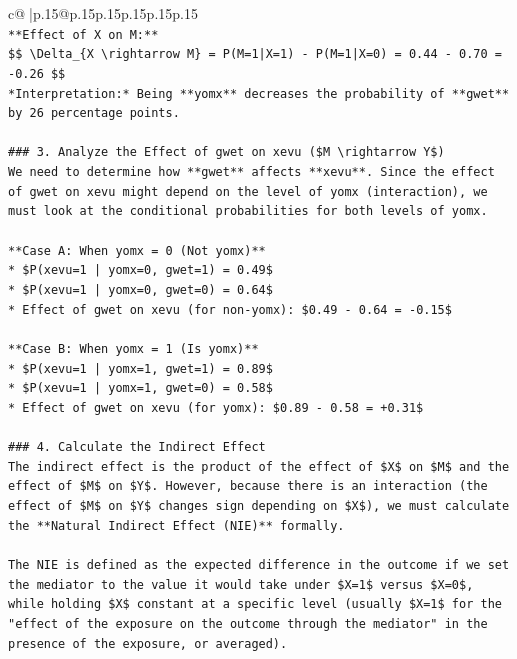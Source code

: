 \documentclass{article}
\begin{document}
{\begin{supertabular}{c@{$\;$}|p{.15\linewidth}@{}p{.15\linewidth}p{.15\linewidth}p{.15\linewidth}p{.15\linewidth}p{.15\linewidth}}
{{{\\ 
\texttt{**Effect of X on M:**} \\
\texttt{\$\$ \textbackslash{}Delta\_\{X \textbackslash{}rightarrow M\} = P(M=1|X=1) {-} P(M=1|X=0) = 0.44 {-} 0.70 = {-}0.26 \$\$} \\
\texttt{*Interpretation:* Being **yomx** decreases the probability of **gwet** by 26 percentage points.} \\
\\ 
\texttt{\#\#\# 3. Analyze the Effect of gwet on xevu (\$M \textbackslash{}rightarrow Y\$)} \\
\texttt{We need to determine how **gwet** affects **xevu**. Since the effect of gwet on xevu might depend on the level of yomx (interaction), we must look at the conditional probabilities for both levels of yomx.} \\
\\ 
\texttt{**Case A: When yomx = 0 (Not yomx)**} \\
\texttt{*   \$P(xevu=1 | yomx=0, gwet=1) = 0.49\$} \\
\texttt{*   \$P(xevu=1 | yomx=0, gwet=0) = 0.64\$} \\
\texttt{*   Effect of gwet on xevu (for non{-}yomx): \$0.49 {-} 0.64 = {-}0.15\$} \\
\\ 
\texttt{**Case B: When yomx = 1 (Is yomx)**} \\
\texttt{*   \$P(xevu=1 | yomx=1, gwet=1) = 0.89\$} \\
\texttt{*   \$P(xevu=1 | yomx=1, gwet=0) = 0.58\$} \\
\texttt{*   Effect of gwet on xevu (for yomx): \$0.89 {-} 0.58 = +0.31\$} \\
\\ 
\texttt{\#\#\# 4. Calculate the Indirect Effect} \\
\texttt{The indirect effect is the product of the effect of \$X\$ on \$M\$ and the effect of \$M\$ on \$Y\$. However, because there is an interaction (the effect of \$M\$ on \$Y\$ changes sign depending on \$X\$), we must calculate the **Natural Indirect Effect (NIE)** formally.} \\
\\ 
\texttt{The NIE is defined as the expected difference in the outcome if we set the mediator to the value it would take under \$X=1\$ versus \$X=0\$, while holding \$X\$ constant at a specific level (usually \$X=1\$ for the "effect of the exposure on the outcome through the mediator" in the presence of the exposure, or averaged).} \\
}}}
\end{supertabular}}
\end{document}
